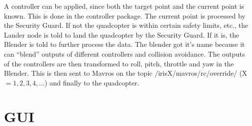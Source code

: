 \documentclass[titlepage,11pt,a4paper]{article}
\begin{document}
A controller can be applied, since both the target point and the
current point is known. This is done in the controller package. The
current point is processed by the Security Guard. If not the
quadcopter is within certain safety limits, etc., the Lander node is
told to land the quadcopter by the Security Guard. If it is, the
Blender is told to further process the data. The blender got it's name
because it can ``blend'' outputs of different controllers and
collision avoidance. The outputs of the controllers are then
transformed to roll, pitch, throttle and yaw in the
Blender. This is then sent to Mavros on the topic
/irisX/mavros/rc/override/ (X $= 1, 2, 3, 4, \dots$) and finally to the
quadcopter.


\section{GUI}
\label{sec:gui}
\end{document}
